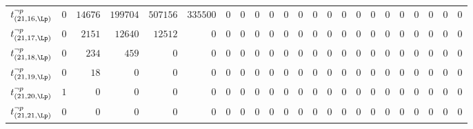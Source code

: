 \begin{tabular}{r|rrrrrrrrrrrrrrrrrrrrrr}
  $t^{\neg p}_{(21,16,\Lp)}$ & $0$ & $14676$ & $199704$ & $507156$ & $335500$ & $0$ & $0$ & $0$ & $0$ & $0$ & $0$ & $0$ & $0$ & $0$ & $0$ & $0$ & $0$ & $0$ & $0$ & $0$ & $0$ & $0$ \\
  $t^{\neg p}_{(21,17,\Lp)}$ & $0$ & $2151$ & $12640$ & $12512$ & $0$ & $0$ & $0$ & $0$ & $0$ & $0$ & $0$ & $0$ & $0$ & $0$ & $0$ & $0$ & $0$ & $0$ & $0$ & $0$ & $0$ & $0$ \\
  $t^{\neg p}_{(21,18,\Lp)}$ & $0$ & $234$ & $459$ & $0$ & $0$ & $0$ & $0$ & $0$ & $0$ & $0$ & $0$ & $0$ & $0$ & $0$ & $0$ & $0$ & $0$ & $0$ & $0$ & $0$ & $0$ & $0$ \\
  $t^{\neg p}_{(21,19,\Lp)}$ & $0$ & $18$ & $0$ & $0$ & $0$ & $0$ & $0$ & $0$ & $0$ & $0$ & $0$ & $0$ & $0$ & $0$ & $0$ & $0$ & $0$ & $0$ & $0$ & $0$ & $0$ & $0$ \\
  $t^{\neg p}_{(21,20,\Lp)}$ & $1$ & $0$ & $0$ & $0$ & $0$ & $0$ & $0$ & $0$ & $0$ & $0$ & $0$ & $0$ & $0$ & $0$ & $0$ & $0$ & $0$ & $0$ & $0$ & $0$ & $0$ & $0$ \\
  $t^{\neg p}_{(21,21,\Lp)}$ & $0$ & $0$ & $0$ & $0$ & $0$ & $0$ & $0$ & $0$ & $0$ & $0$ & $0$ & $0$ & $0$ & $0$ & $0$ & $0$ & $0$ & $0$ & $0$ & $0$ & $0$ & $0$ \\
\end{tabular}
